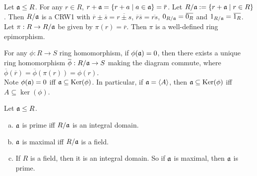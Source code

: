 \begin{construction}
    Let $\mathfrak{a} \leq R$. For any $r \in R$, $r+\ffa = \{r + a \mid a \in \ffa\} = \overbar r$. Let $R/\mathfrak{a} := \{r + \mathfrak{a} \mid r \in R\}$. Then $R/\mathfrak{a}$ is a CRW1 with $\overbar r \pm \overbar s = \overbar {r \pm s}$, $\overbar r \overbar s = \overbar{rs}$, $0_{R/\ffa} = \overbar {0_R}$ and $1_{R/\ffa} = \overbar {1_R}$. \\
    Let $\pi: R \to R/\mathfrak{a}$ be given by $\pi(r) = \overbar r$. Then $\pi$ is a well-defined ring epimorphism.
    \begin{center}
    \end{center}
    For any $\phi: R \to S$ ring homomorphism, if $\phi(\mathfrak{a}) = 0$, then there exists a unique ring homomorphism $\overbar \phi: R/\ffa \to S$ making the diagram commute, where $\overbar \phi(\overbar r) = \overbar \phi (\pi(r)) = \phi(r)$. \\
    Note $\phi(\mathfrak{a}) = 0$ iff $\mathfrak{a} \subseteq \operatorname{Ker}(\phi)$. In particular, if $\mathfrak{a} = \langle A \rangle$, then $\mathfrak{a} \subseteq \operatorname{Ker}(\phi)$ iff $A \subseteq \ker(\phi)$.
\end{construction}

\begin{fact}
    Let $\mathfrak{a} \leq R$. 
    \begin{enumerate}[(a)]
        \item $\mathfrak{a}$ is prime iff $R/\mathfrak{a}$ is an integral domain.
        \item $\mathfrak{a}$ is maximal iff $R/\mathfrak{a}$ is a field.
        \item If $R$ is a field, then it is an integral domain. So if $\mathfrak{a}$ is maximal, then $\mathfrak{a}$ is prime.
    \end{enumerate}
\end{fact}

